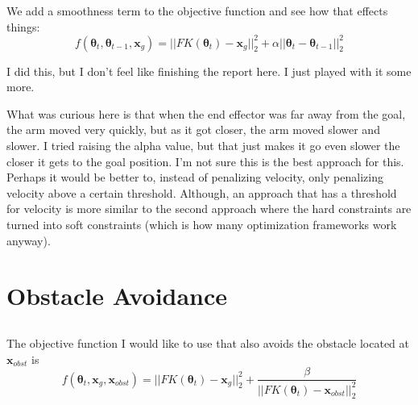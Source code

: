 \documentclass{article}
\renewcommand{\vec}[1]{\bm{#1}}
\begin{document}
We add a smoothness term to the objective function and see how that effects
things:
%
\begin{equation*}
  f(\vec{\theta}_t, \vec{\theta}_{t-1}, \vec{x}_g)
    =
      ||
        FK(\vec{\theta}_t)
        -
        \vec{x}_g
      ||_2^2
      +
      \alpha
      ||
        \vec{\theta}_t
        -
        \vec{\theta}_{t-1}
      ||_2^2
\end{equation*}

I did this, but I don't feel like finishing the report here.
%
I just played with it some more.


What was curious here is that when the end effector was far away from the goal,
the arm moved very quickly, but as it got closer, the arm moved slower and
slower.
%
I tried raising the alpha value, but that just makes it go even slower the
closer it gets to the goal position.
%
I'm not sure this is the best approach for this.
%
Perhaps it would be better to, instead of penalizing velocity, only penalizing
velocity above a certain threshold.
%
Although, an approach that has a threshold for velocity is more similar to the
second approach where the hard constraints are turned into soft constraints
(which is how many optimization frameworks work anyway).


\section{Obstacle Avoidance}

\subsection{}

The objective function I would like to use that also avoids the obstacle
located at $\vec{x}_{obst}$ is
%
\begin{equation*}
  f(\vec{\theta}_t, \vec{x}_g, \vec{x}_{obst})
    =
      ||FK(\vec{\theta}_t) - \vec{x}_g||_2^2
      +
      \frac{
        \beta
      }{
        ||FK(\vec{\theta}_t) - \vec{x}_{obst}||_2^2
      }
\end{equation*}

\subsection{}
\end{document}
